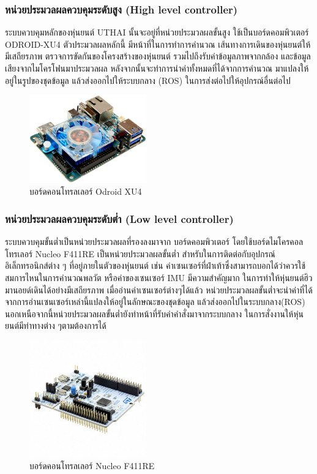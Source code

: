\clearpage
\subsubsection{หน่วยประมวลผลควบคุมระดับสูง (High level controller)}
ระบบควบคุมหลักของหุ่นยนต์ UTHAI นั้นจะอยู่ที่หน่วยประมวลผลขั้นสูง ใช้เป็นบอร์ดคอมพิวเตอร์ ODROID-XU4 ตัวประมวลผลหลักนี้
มีหน้าที่ในการทำการคำนวณ เส้นทางการเดินของหุ่นยนต์ให้มีเสถียรภาพ ตรวจการขัดกันของโครงสร้างของหุ่นยนต์
รวมไปถึงรับค่าข้อมูลภาพจากกล้อง และข้อมูลเสียงจากไมโครโฟนมาประมวลผล หลังจากนั้นจะทำการนำค่าทั้งหมดที่ได้จากการคำนวณ
มาแปลงให้อยู่ในรูปของชุดข้อมูล แล้วส่งออกไปให้ระบบกลาง (ROS) ในการส่งต่อไปให้อุปกรณ์อื่นต่อไป

\begin{figure}[ht]
	\centering
	\includegraphics[width=0.45\textwidth]{chapter3/images/odroid_xu4.jpeg}
	\caption{บอร์ดคอนโทรลเลอร์ Odroid XU4}
	\label{fig:controller_xu4}
\end{figure}

\subsubsection{หน่วยประมวลผลควบคุมระดับต่ำ (Low level controller)}
ระบบควบคุมขั้นต่ำเป็นหน่วยประมวลผลที่รองลงมาจาก บอร์ดคอมพิวเตอร์ โดยใช้บอร์ดไมโครคอลโทรเลอร์ Nucleo F411RE
เป็นหน่วยประมวลผลขั้นต่ำ สำหรับในการติดต่อกับอุปกรณ์อิเล็กทรอนิกส์ต่าง ๆ ที่อยู่ภายในตัวของหุ่นยนต์ เช่น
ค่าเซนเซอร์ที่ฝ่าเท้าซึ่งสามารถบอกได้ว่าควรใช้สมการไหนในการคำนวณพลวัต หรือค่าของเซนเซอร์ IMU มีความสำคัญมาก
ในการทำให้หุ่นยนต์ฮิวมานอยด์เดินได้อย่างมีเสถียรภาพ เมื่ออ่านค่าเซนเซอร์ต่างๆได้แล้ว
หน่วยประมวลผลขั้นต่ำจะนำค่าที่ได้จากการอ่านเซนเซอร์เหล่านี้แปลงให้อยู่ในลักษณะของชุดข้อมูล แล้วส่งออกไปในระบบกลาง(ROS)
นอกเหนือจากนี้หน่วยประมวลผลขั้นต่ำยังทำหน้าที่รับค่าคำสั่งมาจากระบบกลาง ในการสั่งงานให้หุ่นยนต์มีท่าทางต่าง ๆตามต้องการได้

\begin{figure}[ht]
	\centering
	\includegraphics[width=0.45\textwidth]{chapter3/images/nucleo_f411re.jpeg}
	\caption{บอร์ดคอนโทรลเลอร์ Nucleo F411RE}
	\label{fig:controller_f411re}
\end{figure}


